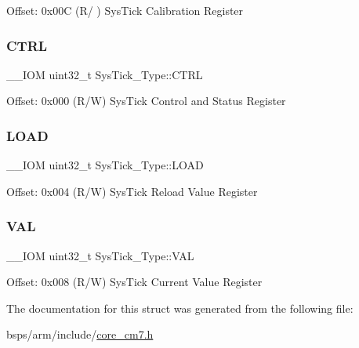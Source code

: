 Offset\+: 0x00C (R/ ) Sys\+Tick Calibration Register \mbox{\label{structSysTick__Type_a875e7afa5c4fd43997fb544a4ac6e37e}} 
\subsubsection{\texorpdfstring{CTRL}{CTRL}}
{\footnotesize\ttfamily \+\_\+\+\_\+\+I\+OM uint32\+\_\+t Sys\+Tick\+\_\+\+Type\+::\+C\+T\+RL}

Offset\+: 0x000 (R/W) Sys\+Tick Control and Status Register \mbox{\label{structSysTick__Type_a4780a489256bb9f54d0ba8ed4de191cd}} 
\subsubsection{\texorpdfstring{LOAD}{LOAD}}
{\footnotesize\ttfamily \+\_\+\+\_\+\+I\+OM uint32\+\_\+t Sys\+Tick\+\_\+\+Type\+::\+L\+O\+AD}

Offset\+: 0x004 (R/W) Sys\+Tick Reload Value Register \mbox{\label{structSysTick__Type_a9b5420d17e8e43104ddd4ae5a610af93}} 
\subsubsection{\texorpdfstring{VAL}{VAL}}
{\footnotesize\ttfamily \+\_\+\+\_\+\+I\+OM uint32\+\_\+t Sys\+Tick\+\_\+\+Type\+::\+V\+AL}

Offset\+: 0x008 (R/W) Sys\+Tick Current Value Register 

The documentation for this struct was generated from the following file\+:\begin{DoxyCompactItemize}
\item 
bsps/arm/include/\mbox{\hyperlink{core__cm7_8h}{core\+\_\+cm7.\+h}}\end{DoxyCompactItemize}
